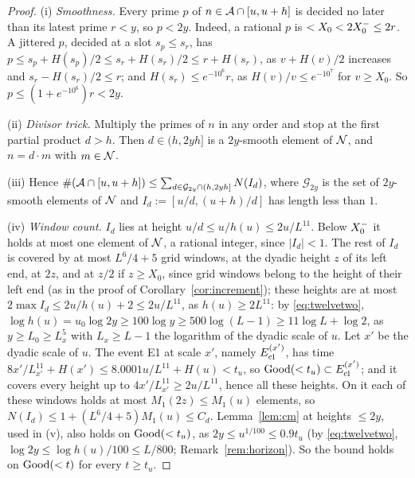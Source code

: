 \begin{proof}
(i) \emph{Smoothness.} Every prime $p$ of $n\in\mathcal{A}\cap[u,u+h]$ is decided no later than its latest prime $r<y$, so $p<2y$.
Indeed, a rational $p$ is $<X_0<2X_0^{-}\le2r$. A jittered $p$, decided at a slot $s_p\le s_r$, has
$p\le s_p+H(s_p)/2\le s_r+H(s_r)/2\le r+H(s_r)$, as $v+H(v)/2$ increases and $s_r-H(s_r)/2\le r$; and $H(s_r)\le e^{-10^6}r$, as
$H(v)/v\le e^{-10^7}$ for $v\ge X_0$. So $p\le(1+e^{-10^6})r<2y$.

(ii) \emph{Divisor trick.} Multiply the primes of $n$ in any order and stop at the first partial product $d>h$. Then
$d\in(h,2yh]$ is a $2y$-smooth element of $\mathcal{N}$, and $n=d\cdot m$ with $m\in\mathcal{N}$.

(iii) Hence $\#(\mathcal{A}\cap[u,u+h])\le\sum_{d\in\mathcal G_{2y}\cap(h,2yh]}N(I_d)$, where $\mathcal G_{2y}$ is the set of
$2y$-smooth elements of $\mathcal{N}$ and $I_d:=[u/d,(u+h)/d]$ has length less than $1$.

(iv) \emph{Window count.} $I_d$ lies at height $u/d\le u/h(u)\le2u/L^{11}$. Below $X_0^{-}$ it holds at most one element
of $\mathcal{N}$, a rational integer, since $|I_d|<1$. The rest of $I_d$ is covered by at most $L^6/4+5$ grid windows, at the
dyadic height $z$ of its left end, at $2z$, and at $z/2$ if $z\ge X_0$, since grid windows belong to the height of their left end (as in
the proof of Corollary~\ref{cor:increment}); these heights are at most $2\max I_d\le2u/h(u)+2\le2u/L^{11}$, as
$h(u)\ge2L^{11}$: by \eqref{eq:twelvetwo},
$\log h(u)=u_0\log2y\ge100\log y\ge500\log(L-1)\ge11\log L+\log2$, as $y\ge L_0\ge L_x^5$ with $L_x\ge L-1$ the logarithm of the dyadic
scale of $u$. Let $x'$ be the dyadic scale of $u$. The event E1 at scale $x'$, namely $E_{\mathrm{cl}}^{(x')}$, has time
$8x'/L_{x'}^{11}+H(x')\le8.0001u/L^{11}+H(u)<t_u$, so $\mathrm{Good}(<t_u)\subset E_{\mathrm{cl}}^{(x')}$; and it covers every height up to
$4x'/L_{x'}^{11}\ge2u/L^{11}$, hence all these heights. On it each of these windows holds at most $M_1(2z)\le M_1(u)$
elements, so $N(I_d)\le1+(L^6/4+5)M_1(u)\le C_d$. Lemma~\ref{lem:cm} at heights $\le2y$, used in (v), also holds on $\mathrm{Good}(<t_u)$, as
$2y\le u^{1/100}\le0.9t_u$ (by \eqref{eq:twelvetwo}, $\log2y\le\log h(u)/100\le L/800$; Remark~\ref{rem:horizon}). So the bound holds on
$\mathrm{Good}(<t)$ for every $t\ge t_u$.


\end{proof}
